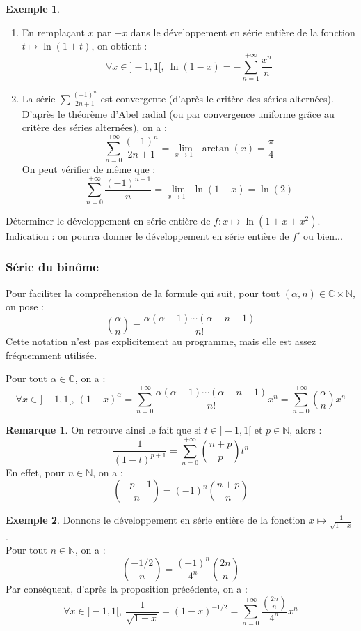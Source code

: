 \documentclass[french]{article}
\newcommand{\N}{\mathbb{N}}
\newcommand{\C}{\mathbb{C}}
\theoremstyle{plain}
\theoremstyle{definition}
\newtheorem*{ex}{Exemple}
\newtheorem*{rmq}{Remarque}
\theoremstyle{remark}
\begin{document}
\begin{ex}%
	\begin{enumerate}
		\item En remplaçant $x$ par $-x$ dans le développement en série entière de la fonction $t\mapsto\ln(1+t)$, on obtient : $$\forall x\in]-1,1[,\ \ln(1-x)=-\sum_{n=1}^{+\infty}\frac{x^n}{n}$$
		\item La série $\displaystyle\sum\frac{(-1)^n}{2n+1}$ est convergente (d'après le critère des séries alternées). D'après le théorème d'Abel radial (ou par convergence uniforme grâce au critère des séries alternées), on a : $$\sum_{n=0}^{+\infty}\frac{(-1)^n}{2n+1}=\underset{x\to 1^-}{\lim}\arctan(x)=\frac{\pi}{4}$$ On peut vérifier de même que : $$\sum_{n=0}^{+\infty}\frac{(-1)^{n-1}}{n}=\underset{x\to 1^-}{\lim}\ln(1+x)=\ln(2)$$
	\end{enumerate}
\end{ex}

\begin{exo}
	Déterminer le développement en série entière de $f:x\mapsto\ln(1+x+x^2)$. \\
	Indication : on pourra donner le développement en série entière de $f'$ ou bien...
\end{exo}

\subsubsection*{Série du binôme}

Pour faciliter la compréhension de la formule qui suit, pour tout $(\alpha,n)\in\C\times\N$, on pose : $$\binom{\alpha}{n}=\frac{\alpha(\alpha-1)\cdots(\alpha-n+1)}{n!}$$ Cette notation n'est pas explicitement au programme, mais elle est assez fréquemment utilisée.

\begin{prop}%
	Pour tout $\alpha\in\C$, on a : $$\forall x\in]-1,1[,\ (1+x)^\alpha=\sum_{n=0}^{+\infty}\frac{\alpha(\alpha-1)\cdots(\alpha-n+1)}{n!}x^n=\sum_{n=0}^{+\infty}\binom{\alpha}{n}x^n$$
\end{prop}

\begin{rmq}
	On retrouve ainsi le fait que si $t\in]-1,1[$ et $p\in\N$, alors : $$\frac{1}{(1-t)^{p+1}}=\sum_{n=0}^{+\infty}\binom{n+p}{p}t^n$$ En effet, pour $n\in\N$, on a : $$\binom{-p-1}{n}=(-1)^n\binom{n+p}{n}$$
\end{rmq}

\begin{ex}
	Donnons le développement en série entière de la fonction $x\mapsto\displaystyle\frac{1}{\sqrt{1-x}}$. \\
	Pour tout $n\in\N$, on a : $$\binom{-1/2}{n}=\frac{(-1)^n}{4^n}\binom{2n}{n}$$ Par conséquent, d'après la proposition précédente, on a : $$\forall x\in]-1,1[,\ \frac{1}{\sqrt{1-x}}=(1-x)^{-1/2}=\sum_{n=0}^{+\infty}\frac{\binom{2n}{n}}{4^n}x^n$$
\end{ex}
\end{document}
